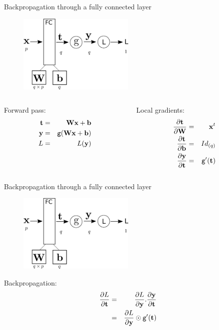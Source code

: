 \documentclass[xcolor=pdftex,dvipsnames,table,mathserif]{beamer}
\begin{document}
\begin{frame}{Backpropagation through a fully connected layer}
  \begin{figure}
    \includegraphics[width=0.5\textwidth]{bp_fc.png}
  \end{figure}

  \begin{columns}
    \begin{column}{0.5\textwidth}
      Forward pass:
      \begin{eqnarray*}
        \mathbf{t} &=& \mathbf{W}\mathbf{x} + \mathbf{b} \\
        \mathbf{y} &=& \texttt{g}(\mathbf{W}\mathbf{x} + \mathbf{b}) \\
        L &=& L(\mathbf{y})
      \end{eqnarray*}
    \end{column}

    \pause

    \begin{column}{0.5\textwidth}
      Local gradients:
      \begin{eqnarray*}
        \pdv{\mathbf{t}}{\mathbf{W}} &=& \mathbf{x}^t \\
        \pdv{\mathbf{t}}{\mathbf{b}} &=& Id_{(q)}
 \\
        \pdv{\mathbf{y}}{\mathbf{t}} &=& \texttt{g}'(\mathbf{t})
      \end{eqnarray*}
    \end{column}
  \end{columns}

\end{frame}

\begin{frame}{Backpropagation through a fully connected layer}
  \begin{figure}
    \includegraphics[width=0.5\textwidth]{bp_fc.png}
  \end{figure}

  Backpropagation:
  \begin{eqnarray*}
    \pdv{L}{\mathbf{t}} &=& \pdv{L}{\mathbf{y}}.\pdv{\mathbf{y}}{\mathbf{t}} \\
    &=& \pdv{L}{\mathbf{y}} \odot \texttt{g}'(\mathbf{t}) \\
  \end{eqnarray*}

\end{frame}
\end{document}
